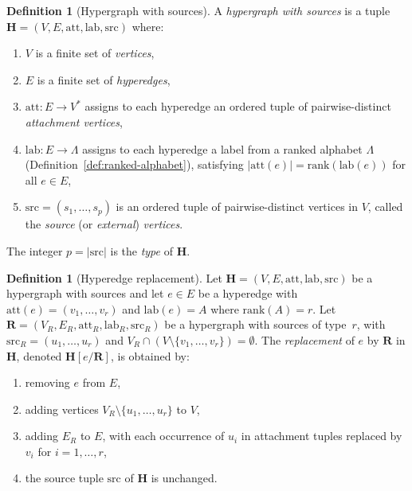 \documentclass[11pt,a4paper]{article}
\theoremstyle{plain}
\theoremstyle{definition}
\newtheorem{definition}[theorem]{Definition}
\theoremstyle{remark}
\begin{document}
\begin{definition}[Hypergraph with sources]\label{def:sourced-hypergraph}
A \emph{hypergraph with sources} is a tuple $\mathbf{H} = (V, E, \mathrm{att}, \mathrm{lab}, \mathrm{src})$ where:
\begin{enumerate}[nosep,label=(\roman*)]
  \item $V$ is a finite set of \emph{vertices},
  \item $E$ is a finite set of \emph{hyperedges},
  \item $\mathrm{att}\colon E \to V^*$ assigns to each hyperedge an ordered tuple of pairwise-distinct \emph{attachment vertices},
  \item $\mathrm{lab}\colon E \to \Lambda$ assigns to each hyperedge a label from a ranked alphabet $\Lambda$ (Definition~\ref{def:ranked-alphabet}), satisfying $|\mathrm{att}(e)| = \mathrm{rank}(\mathrm{lab}(e))$ for all $e \in E$,
  \item $\mathrm{src} = (s_1, \ldots, s_p)$ is an ordered tuple of pairwise-distinct vertices in $V$, called the \emph{source} (or \emph{external}) \emph{vertices}.
\end{enumerate}
The integer $p = |\mathrm{src}|$ is the \emph{type} of $\mathbf{H}$.
\end{definition}

\begin{definition}[Hyperedge replacement]\label{def:hrg-replacement}
Let $\mathbf{H} = (V, E, \mathrm{att}, \mathrm{lab}, \mathrm{src})$ be a hypergraph with sources and let $e \in E$ be a hyperedge with $\mathrm{att}(e) = (v_1, \ldots, v_r)$ and $\mathrm{lab}(e) = A$ where $\mathrm{rank}(A) = r$.
Let $\mathbf{R} = (V_R, E_R, \mathrm{att}_R, \mathrm{lab}_R, \mathrm{src}_R)$ be a hypergraph with sources of type~$r$, with $\mathrm{src}_R = (u_1, \ldots, u_r)$ and $V_R \cap (V \setminus \{v_1,\ldots,v_r\}) = \emptyset$.
The \emph{replacement} of $e$ by $\mathbf{R}$ in $\mathbf{H}$, denoted $\mathbf{H}[e / \mathbf{R}]$, is obtained by:
\begin{enumerate}[nosep,label=(\roman*)]
  \item removing $e$ from $E$,
  \item adding vertices $V_R \setminus \{u_1, \ldots, u_r\}$ to $V$,
  \item adding $E_R$ to $E$, with each occurrence of $u_i$ in attachment tuples replaced by $v_i$ for $i = 1, \ldots, r$,
  \item the source tuple $\mathrm{src}$ of $\mathbf{H}$ is unchanged.
\end{enumerate}
\end{definition}
\end{document}
